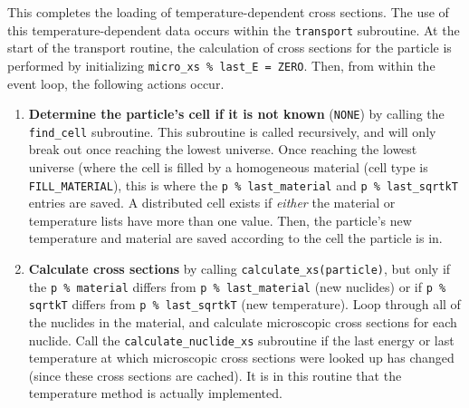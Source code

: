\documentclass[10pt]{article}
\numberwithin{equation}{section} %
\begin{document}
This completes the loading of temperature-dependent cross sections. The use of this temperature-dependent data occurs within the {\tt transport} subroutine. At the start of the transport routine, the calculation of cross sections for the particle is performed by initializing {\tt micro\_xs \% last\_E = ZERO}. Then, from within the event loop, the following actions occur.

\begin{enumerate}
\item {\bf Determine the particle's cell if it is not known} ({\tt NONE}) by calling the {\tt find\_cell} subroutine. This subroutine is called recursively, and will only break out once reaching the lowest universe. Once reaching the lowest universe (where the cell is filled by a homogeneous material (cell type is {\tt FILL\_MATERIAL}), this is where the {\tt p \% last\_material} and {\tt p \% last\_sqrtkT} entries are saved. A distributed cell exists if {\it either} the material or temperature lists have more than one value. Then, the particle's new temperature and material are saved according to the cell the particle is in.

				
		\begin{algorithm}[H]
				\end{algorithm}
				
\item {\bf Calculate cross sections} by calling {\tt calculate\_xs(particle)}, but only if the {\tt p \% material} differs from {\tt p \% last\_material} (new nuclides) or if {\tt p \% sqrtkT} differs from {\tt p \% last\_sqrtkT} (new temperature). Loop through all of the nuclides in the material, and calculate microscopic cross sections for each nuclide. Call the {\tt calculate\_nuclide\_xs} subroutine if the last energy or last temperature at which microscopic cross sections were looked up has changed (since these cross sections are cached). It is in this routine that the temperature method is actually implemented. 
		

\end{enumerate}
\end{document}
